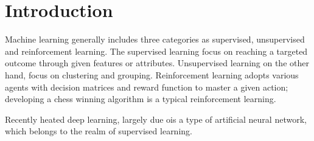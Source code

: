 \section{Introduction}

Machine learning generally includes three categories as supervised, unsupervised and reinforcement learning. The supervised learning focus on reaching a targeted outcome through given features or attributes. Unsupervised learning on the other hand, focus on clustering and grouping. Reinforcement learning adopts various agents with decision matrices and reward function to master a given action; developing a chess winning algorithm is a typical reinforcement learning.
\par
Recently heated deep learning, largely due ois a type of artificial neural network, which belongs to the realm of supervised learning. 
